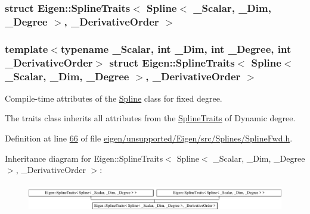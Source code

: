 \subsubsection{struct Eigen\+:\+:Spline\+Traits$<$ Spline$<$ \+\_\+\+Scalar, \+\_\+\+Dim, \+\_\+\+Degree $>$, \+\_\+\+Derivative\+Order $>$}
\subsubsection*{template$<$typename \+\_\+\+Scalar, int \+\_\+\+Dim, int \+\_\+\+Degree, int \+\_\+\+Derivative\+Order$>$\newline
struct Eigen\+::\+Spline\+Traits$<$ Spline$<$ \+\_\+\+Scalar, \+\_\+\+Dim, \+\_\+\+Degree $>$, \+\_\+\+Derivative\+Order $>$}

Compile-\/time attributes of the \hyperlink{group___splines___module_class_eigen_1_1_spline}{Spline} class for fixed degree. 

The traits class inherits all attributes from the \hyperlink{struct_eigen_1_1_spline_traits}{Spline\+Traits} of Dynamic degree. 

Definition at line \hyperlink{eigen_2unsupported_2_eigen_2src_2_splines_2_spline_fwd_8h_source_l00066}{66} of file \hyperlink{eigen_2unsupported_2_eigen_2src_2_splines_2_spline_fwd_8h_source}{eigen/unsupported/\+Eigen/src/\+Splines/\+Spline\+Fwd.\+h}.

Inheritance diagram for Eigen\+:\+:Spline\+Traits$<$ Spline$<$ \+\_\+\+Scalar, \+\_\+\+Dim, \+\_\+\+Degree $>$, \+\_\+\+Derivative\+Order $>$\+:\begin{figure}[H]
\begin{center}
\leavevmode
\includegraphics[height=1.233480cm]{group___splines___module}
\end{center}
\end{figure}
